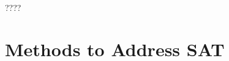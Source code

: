 \documentclass[12pt]{book}
\begin{document}
\begin{examp}\label{exp:bdd}
????
\end{examp}
\section{Methods to Address SAT}
\label{sec:Methods to Address SAT}


\newpage


\end{document}
